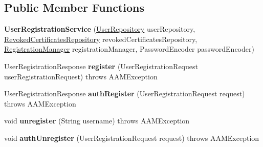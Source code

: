 \subsection*{Public Member Functions}
\begin{DoxyCompactItemize}
\item 
{\bfseries User\+Registration\+Service} (\hyperlink{interfaceeu_1_1h2020_1_1symbiote_1_1security_1_1repositories_1_1UserRepository}{User\+Repository} user\+Repository, \hyperlink{interfaceeu_1_1h2020_1_1symbiote_1_1security_1_1repositories_1_1RevokedCertificatesRepository}{Revoked\+Certificates\+Repository} revoked\+Certificates\+Repository, \hyperlink{classeu_1_1h2020_1_1symbiote_1_1security_1_1commons_1_1RegistrationManager}{Registration\+Manager} registration\+Manager, Password\+Encoder password\+Encoder)\hypertarget{classeu_1_1h2020_1_1symbiote_1_1security_1_1services_1_1UserRegistrationService_a608a1985221a57abe21f72f8f3d1c971}{}\label{classeu_1_1h2020_1_1symbiote_1_1security_1_1services_1_1UserRegistrationService_a608a1985221a57abe21f72f8f3d1c971}

\item 
User\+Registration\+Response {\bfseries register} (User\+Registration\+Request user\+Registration\+Request)  throws A\+A\+M\+Exception \hypertarget{classeu_1_1h2020_1_1symbiote_1_1security_1_1services_1_1UserRegistrationService_aff366e7d6fd800cb052ab1b8382d65db}{}\label{classeu_1_1h2020_1_1symbiote_1_1security_1_1services_1_1UserRegistrationService_aff366e7d6fd800cb052ab1b8382d65db}

\item 
User\+Registration\+Response {\bfseries auth\+Register} (User\+Registration\+Request request)  throws A\+A\+M\+Exception \hypertarget{classeu_1_1h2020_1_1symbiote_1_1security_1_1services_1_1UserRegistrationService_acf0d26da645d54dab064cc6dd1bdeab3}{}\label{classeu_1_1h2020_1_1symbiote_1_1security_1_1services_1_1UserRegistrationService_acf0d26da645d54dab064cc6dd1bdeab3}

\item 
void {\bfseries unregister} (String username)  throws A\+A\+M\+Exception \hypertarget{classeu_1_1h2020_1_1symbiote_1_1security_1_1services_1_1UserRegistrationService_a0c210b7334d284674a19aed79a32d4aa}{}\label{classeu_1_1h2020_1_1symbiote_1_1security_1_1services_1_1UserRegistrationService_a0c210b7334d284674a19aed79a32d4aa}

\item 
void {\bfseries auth\+Unregister} (User\+Registration\+Request request)  throws A\+A\+M\+Exception \hypertarget{classeu_1_1h2020_1_1symbiote_1_1security_1_1services_1_1UserRegistrationService_ac107bca35e067f27926f563f865e5386}{}\label{classeu_1_1h2020_1_1symbiote_1_1security_1_1services_1_1UserRegistrationService_ac107bca35e067f27926f563f865e5386}

\end{DoxyCompactItemize}


